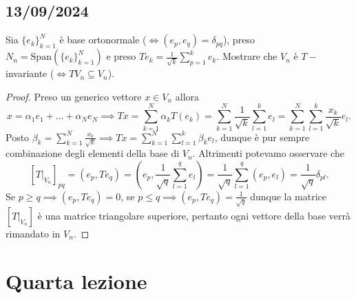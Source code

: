 \documentclass[12pt, twoside, italian, openany]{book}
\begin{document}
	\section{13/09/2024}
	Sia $\{ e_k \}_{k=1}^N$ è base ortonormale ($\iff (e_p, e_q) = \delta_{pq}$), preso $N_n = \text{Span}(\{ e_k \}^N_{k=1})$ e preso $Te_k = \frac{1}{\sqrt{k}} \sum_{p=1}^k e_k$. Mostrare che $V_n$ è $T-$invariante ($\iff TV_n \subseteq V_n$).
	\begin{proof}
		Preso un generico vettore $x \in V_n$ allora
		$$
		x = \alpha_1 e_1 + \ldots + \alpha_N e_N \implies Tx = \sum_{k=1}^N \alpha_k T(e_k) = \sum_{k=1}^N \frac{1}{\sqrt{k}} \sum_{l=1}^k e_l = \sum_{k=1}^N \sum_{l=1}^k \frac{x_k}{\sqrt{k}} e_l.
		$$
		Posto $\beta_k = \sum_{k=1}^N \frac{x_k}{\sqrt{k}} \implies Tx = \sum_{k=1}^N \sum_{l=1}^k \beta_k e_l$, dunque è pur sempre combinazione degli elementi della base di $V_n$. Altrimenti potevamo osservare che
		$$
		[T|_{V_n}]_{pq} = (e_p, Te_q) = (e_p, \frac{1}{\sqrt{q}} \sum_{l=1}^q e_l) = \frac{1}{\sqrt{q}} \sum_{l=1}^q (e_p, e_l) = \frac{1}{\sqrt{q}} \delta_{pl}.
		$$
		Se $p \geq q \implies (e_p, Te_q) = 0$, se $p \leq q \implies (e_p, Te_q) = \frac{1}{\sqrt{q}}$ dunque la matrice $[T|_{V_n}]$ è una matrice triangolare superiore, pertanto ogni vettore della base verrà rimandato in $V_n$.
		
	\end{proof}
	\chapter{Quarta lezione}
\end{document}
